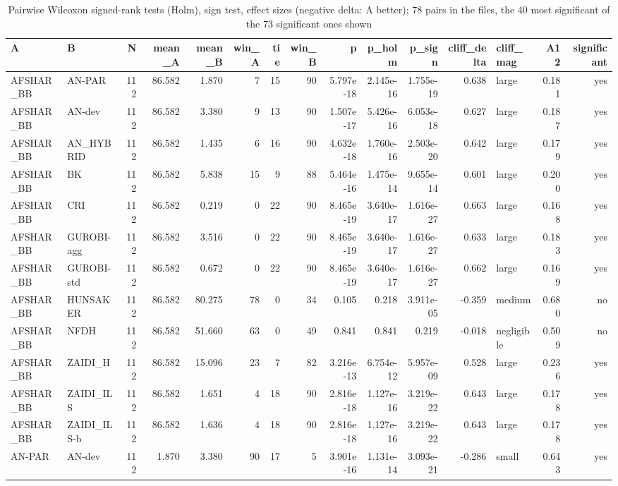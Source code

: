 \begin{table}[htbp]
\centering
\small
\caption{Pairwise Wilcoxon signed-rank tests (Holm), sign test, effect sizes (negative delta: A better); 78 pairs in the files, the 40 most significant of the 73 significant ones shown}
\label{tab:E10a_state_of_the_art_b10_pairwise}
\begin{tabular}{llrrrrrrrrrrlrr}
\toprule
A & B & N & mean\_A & mean\_B & win\_A & tie & win\_B & p & p\_holm & p\_sign & cliff\_delta & cliff\_mag & A12 & significant \\
\midrule
AFSHAR\_BB & AN-PAR & 112 & 86.582 & 1.870 & 7 & 15 & 90 & 5.797e-18 & 2.145e-16 & 1.755e-19 & 0.638 & large & 0.181 & yes \\
AFSHAR\_BB & AN-dev & 112 & 86.582 & 3.380 & 9 & 13 & 90 & 1.507e-17 & 5.426e-16 & 6.053e-18 & 0.627 & large & 0.187 & yes \\
AFSHAR\_BB & AN\_HYBRID & 112 & 86.582 & 1.435 & 6 & 16 & 90 & 4.632e-18 & 1.760e-16 & 2.503e-20 & 0.642 & large & 0.179 & yes \\
AFSHAR\_BB & BK & 112 & 86.582 & 5.838 & 15 & 9 & 88 & 5.464e-16 & 1.475e-14 & 9.655e-14 & 0.601 & large & 0.200 & yes \\
AFSHAR\_BB & CRI & 112 & 86.582 & 0.219 & 0 & 22 & 90 & 8.465e-19 & 3.640e-17 & 1.616e-27 & 0.663 & large & 0.168 & yes \\
AFSHAR\_BB & GUROBI-agg & 112 & 86.582 & 3.516 & 0 & 22 & 90 & 8.465e-19 & 3.640e-17 & 1.616e-27 & 0.633 & large & 0.183 & yes \\
AFSHAR\_BB & GUROBI-std & 112 & 86.582 & 0.672 & 0 & 22 & 90 & 8.465e-19 & 3.640e-17 & 1.616e-27 & 0.662 & large & 0.169 & yes \\
AFSHAR\_BB & HUNSAKER & 112 & 86.582 & 80.275 & 78 & 0 & 34 & 0.105 & 0.218 & 3.911e-05 & -0.359 & medium & 0.680 & no \\
AFSHAR\_BB & NFDH & 112 & 86.582 & 51.660 & 63 & 0 & 49 & 0.841 & 0.841 & 0.219 & -0.018 & negligible & 0.509 & no \\
AFSHAR\_BB & ZAIDI\_H & 112 & 86.582 & 15.096 & 23 & 7 & 82 & 3.216e-13 & 6.754e-12 & 5.957e-09 & 0.528 & large & 0.236 & yes \\
AFSHAR\_BB & ZAIDI\_ILS & 112 & 86.582 & 1.651 & 4 & 18 & 90 & 2.816e-18 & 1.127e-16 & 3.219e-22 & 0.643 & large & 0.178 & yes \\
AFSHAR\_BB & ZAIDI\_ILS-b & 112 & 86.582 & 1.636 & 4 & 18 & 90 & 2.816e-18 & 1.127e-16 & 3.219e-22 & 0.643 & large & 0.178 & yes \\
AN-PAR & AN-dev & 112 & 1.870 & 3.380 & 90 & 17 & 5 & 3.901e-16 & 1.131e-14 & 3.093e-21 & -0.286 & small & 0.643 & yes \\

\end{tabular}
\end{table}
